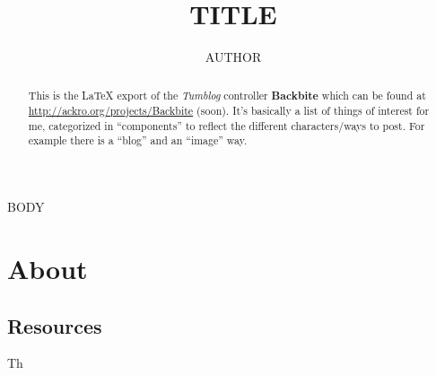 \documentclass[a4paper,11pt]{article}
\title{TITLE}
\author{AUTHOR}
\begin{document}
\maketitle
\begin{abstract}
  This is the \LaTeX{} export of the \emph{Tumblog} controller
  \textbf{Backbite} which can be found at
  \url{http://ackro.org/projects/Backbite} (soon). It's basically a list of
  things of interest for me, categorized in ``components'' to reflect
  the different characters/ways to post. For example there is a
  ``blog'' and an ``image'' way.
\end{abstract}
\tableofcontents


BODY

\section{About}
\subsection{Resources}
Th
\end{document}

